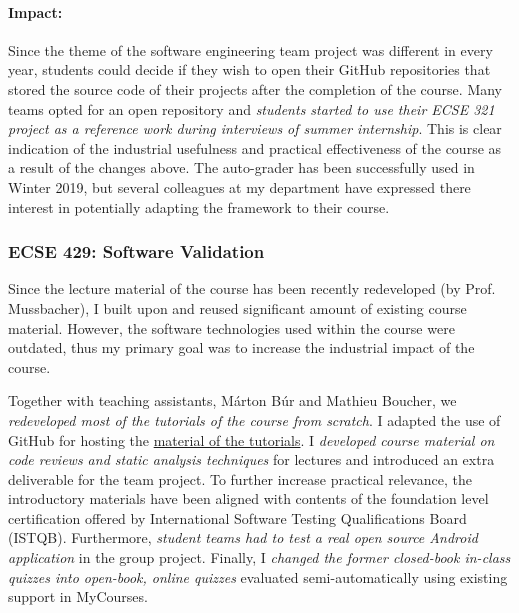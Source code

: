 \paragraph{Impact:}
Since the theme of the software engineering team project was different in every year, students could decide if they wish to open their GitHub repositories that stored the source code of their projects after the completion of the course. Many teams opted for an open repository and \emph{students started to use their ECSE 321 project as a reference work during interviews of summer internship}. This is clear indication of the industrial usefulness and practical effectiveness of the course as a result of the changes above. 
The auto-grader has been successfully used in Winter 2019, but several colleagues at my department have expressed there interest in potentially adapting the framework to their course. 


\subsubsection{ECSE 429: Software Validation}


Since the lecture material of the course has been recently redeveloped (by Prof. Mussbacher), I built upon and reused significant amount of existing course material. However, the software technologies used within the course were outdated, thus my primary goal was to increase the industrial impact of the course. %

Together with teaching assistants, Márton Búr and Mathieu Boucher, we \emph{redeveloped most of the tutorials of the course from scratch}. I adapted the use of GitHub for hosting the \href{https://mcgill-ecse429-fall2018.github.io/Tutorial-Lecture-Notes/}{material of the tutorials}. I \emph{developed course material on code reviews and static analysis techniques} for lectures and introduced an extra deliverable for the team project. To further increase practical relevance, the introductory materials  have been aligned with contents of the foundation level certification offered by International Software Testing Qualifications Board (ISTQB). Furthermore, \emph{student teams had to test a real open source Android application} in the group project.  Finally, I \emph{changed the former closed-book in-class quizzes into open-book, online quizzes} evaluated semi-automatically using existing support in MyCourses.


